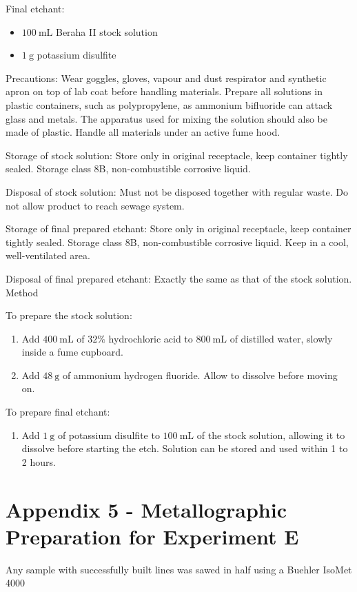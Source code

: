 \documentclass[10pt]{article}
\begin{document}
Final etchant:

\begin{itemize}
  \item $100 \mathrm{~mL}$ Beraha II stock solution
  \item $1 \mathrm{~g}$ potassium disulfite
\end{itemize}

Precautions: Wear goggles, gloves, vapour and dust respirator and synthetic apron on top of lab coat before handling materials. Prepare all solutions in plastic containers, such as polypropylene, as ammonium bifluoride can attack glass and metals. The apparatus used for mixing the solution should also be made of plastic. Handle all materials under an active fume hood.

Storage of stock solution: Store only in original receptacle, keep container tightly sealed. Storage class 8B, non-combustible corrosive liquid.

Disposal of stock solution: Must not be disposed together with regular waste. Do not allow product to reach sewage system.

Storage of final prepared etchant: Store only in original receptacle, keep container tightly sealed. Storage class 8B, non-combustible corrosive liquid. Keep in a cool, well-ventilated area.

Disposal of final prepared etchant: Exactly the same as that of the stock solution. Method

To prepare the stock solution:

\begin{enumerate}
  \item Add $400 \mathrm{~mL}$ of $32 \%$ hydrochloric acid to $800 \mathrm{~mL}$ of distilled water, slowly inside a fume cupboard.

  \item Add $48 \mathrm{~g}$ of ammonium hydrogen fluoride. Allow to dissolve before moving on.

\end{enumerate}

To prepare final etchant:

\begin{enumerate}
  \item Add $1 \mathrm{~g}$ of potassium disulfite to $100 \mathrm{~mL}$ of the stock solution, allowing it to dissolve before starting the etch. Solution can be stored and used within 1 to 2 hours.
\end{enumerate}

\section*{Appendix 5 - Metallographic Preparation for Experiment E}
Any sample with successfully built lines was sawed in half using a Buehler IsoMet 4000
\end{document}
